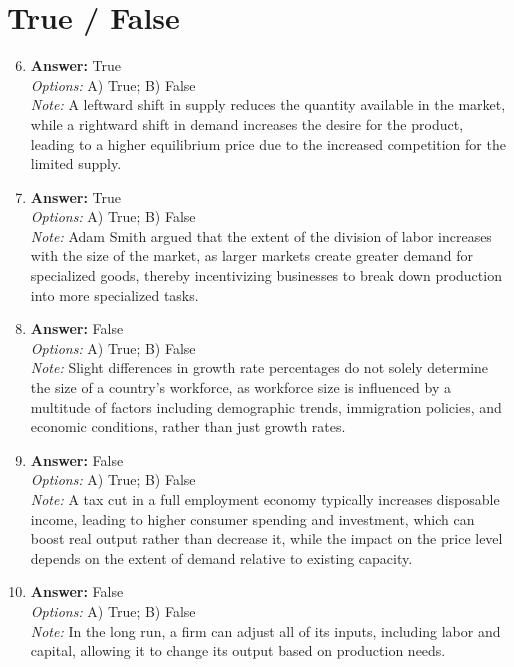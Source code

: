 \documentclass[12pt]{article}
\begin{document}
\section*{True / False}
\begin{enumerate}[label=\arabic*.]
\setcounter{enumi}{5}
\item \textbf{Answer:} True
\\ \textit{Options:} A) True; B) False
\\ \textit{Note:} A leftward shift in supply reduces the quantity available in the market, while a rightward shift in demand increases the desire for the product, leading to a higher equilibrium price due to the increased competition for the limited supply.
\item \textbf{Answer:} True
\\ \textit{Options:} A) True; B) False
\\ \textit{Note:} Adam Smith argued that the extent of the division of labor increases with the size of the market, as larger markets create greater demand for specialized goods, thereby incentivizing businesses to break down production into more specialized tasks.
\item \textbf{Answer:} False
\\ \textit{Options:} A) True; B) False
\\ \textit{Note:} Slight differences in growth rate percentages do not solely determine the size of a country's workforce, as workforce size is influenced by a multitude of factors including demographic trends, immigration policies, and economic conditions, rather than just growth rates.
\item \textbf{Answer:} False
\\ \textit{Options:} A) True; B) False
\\ \textit{Note:} A tax cut in a full employment economy typically increases disposable income, leading to higher consumer spending and investment, which can boost real output rather than decrease it, while the impact on the price level depends on the extent of demand relative to existing capacity.
\item \textbf{Answer:} False
\\ \textit{Options:} A) True; B) False
\\ \textit{Note:} In the long run, a firm can adjust all of its inputs, including labor and capital, allowing it to change its output based on production needs.
\end{enumerate}
\end{document}
